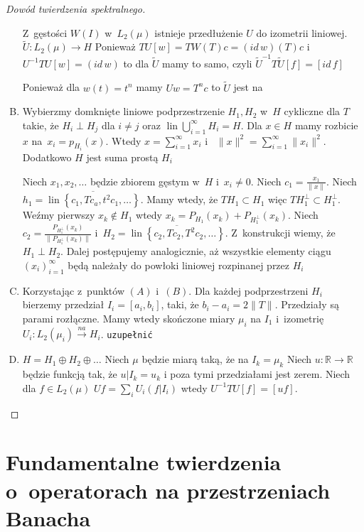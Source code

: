 \documentclass[11pt]{mwrep}
\renewcommand{\[}{\begin{equation}}
\renewcommand{\]}{\end{equation}}
\newcommand{\R}{{\ensuremath{\mathbb R}}}
\newcommand{\lin}{\operatorname{lin}}
\newcounter{numer}
\begin{document}
\begin{proof}[Dowód twierdzenia spektralnego]
\begin{enumerate}[(A)]
			Z~gęstości $W(I)$  w~$L_2(\mu)$ istnieje przedłużenie $U$ do izometrii liniowej.
			$\widetilde{U} \colon L_2 (\mu) \to H $
			Ponieważ $TU[w]  = TW(T) c = (id\, w) (T) c$ i $U^{-1}TU[w]= \left( id\,w \right)$
			to dla $\widetilde{U}$ mamy to samo, czyli $\widetilde{U}^{-1}T \widetilde{U} [f] = [id\, f]$ \par
			Ponieważ dla $w(t) = t^n$ mamy  $Uw = T^n c$ to $\widetilde{U}$ jest na
		\item %
			Wybierzmy domknięte liniowe podprzestrzenie $H_1, H_2$ w~$H$ cykliczne dla $T$ takie, że $H_i \perp H_j$ dla $i\not = j$ oraz 
			$\lin \bigcup_{i=1}^\infty H_i = H$. Dla $x\in H$ mamy rozbicie $x$ na~$x_i = p_{H_i}(x)$. Wtedy $x =\sum_{i=1}^\infty x_i$ i~
			$\|x\|^2 = \sum_{i=1}^\infty \|x_i\|^2$. Dodatkowo $H$ jest suma prostą $H_i$\par
			Niech $x_1, x_2,\ldots$ będzie zbiorem gęstym w~$H$ i~$x_i \not = 0$. 
			Niech $c_1  = \frac{x_1 }{\|x\|}$. Niech $h_1 = \overline{\lin\left\{ c_1, Tc_a, t^2 c_1,\ldots \right\}}$.
			Mamy wtedy, że $TH_1 \subset H_1$ więc $TH_1^\perp \subset H_1^\perp$. Weźmy pierwszy $x_k \not \in H_1$ wtedy 
			$x_k = P_{H_1}(x_k)+ P_{H_1^\perp}(x_k)$. Niech $c_2 = \frac{P_{H_1^\perp}(x_k)}{\|P_{H_1^\perp}(x_k)\|}$
			i~$H_2= \overline{\lin\left\{ c_2, Tc_2, T^2c_2,\ldots \right\}}$. Z~konstrukcji wiemy, że $H_1 \perp H_2$. 
			Dalej postępujemy analogicznie, aż wszystkie elementy ciągu $(x_i)_{i=1}^\infty$ będą należały do powłoki liniowej rozpinanej przez $H_i$ \par
		\item Korzystając z~punktów $(A)$ i~$(B)$. Dla każdej podprzestrzeni $H_i$ bierzemy przedział $I_i = [a_i, b_i]$, taki, że $b_i -a_i = 2\|T\|$.
			Przedziały są parami rozłączne. Mamy wtedy skończone miary $\mu_i$ na $I_1$ i~izometrię $U_i \colon L_2(\mu_i) \overset{na}{\to} H_i$.
			\texttt{uzupełnić}
		\item $H = H_1 \oplus H_2 \oplus \ldots$
			Niech $\mu$ będzie miarą taką, że na $I_k = \mu_k$ 
			Niech $u\colon \R \to \R$ będzie funkcją tak, że $u|I_k = u_k$ i poza tymi przedziałami jest zerem.
			Niech dla $f \in L_2(\mu)$  $Uf = \sum_i U_i (f|I_i)$ wtedy $ U^{-1 }T U [f] = [uf]$.
	\end{enumerate}
	
\end{proof}
\chapter{Fundamentalne twierdzenia o~operatorach na przestrzeniach Banacha}
\end{document}
